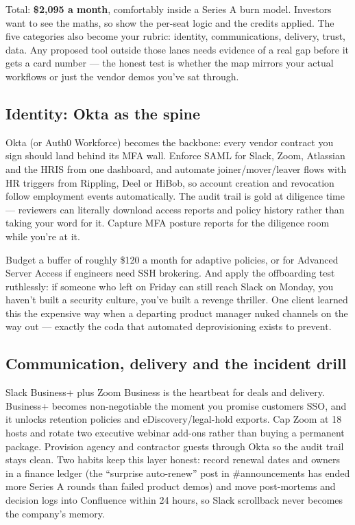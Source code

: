 Total: \textbf{\$2,095 a month}, comfortably inside a Series A burn model. Investors want to see the maths, so show the per-seat logic and the credits applied. The five categories also become your rubric: identity, communications, delivery, trust, data. Any proposed tool outside those lanes needs evidence of a real gap before it gets a card number — the honest test is whether the map mirrors your actual workflows or just the vendor demos you've sat through.



\subsection{Identity: Okta as the spine}


Okta (or Auth0 Workforce) becomes the backbone: every vendor contract you sign should land behind its MFA wall. Enforce SAML for Slack, Zoom, Atlassian and the HRIS from one dashboard, and automate joiner/mover/leaver flows with HR triggers from Rippling, Deel or HiBob, so account creation and revocation follow employment events automatically. The audit trail is gold at diligence time — reviewers can literally download access reports and policy history rather than taking your word for it. Capture MFA posture reports for the diligence room while you're at it.


Budget a buffer of roughly \$120 a month for adaptive policies, or for Advanced Server Access if engineers need SSH brokering. And apply the offboarding test ruthlessly: if someone who left on Friday can still reach Slack on Monday, you haven't built a security culture, you've built a revenge thriller. One client learned this the expensive way when a departing product manager nuked channels on the way out — exactly the coda that automated deprovisioning exists to prevent.



\subsection{Communication, delivery and the incident drill}


Slack Business+ plus Zoom Business is the heartbeat for deals and delivery. Business+ becomes non-negotiable the moment you promise customers SSO, and it unlocks retention policies and eDiscovery/legal-hold exports. Cap Zoom at 18 hosts and rotate two executive webinar add-ons rather than buying a permanent package. Provision agency and contractor guests through Okta so the audit trail stays clean. Two habits keep this layer honest: record renewal dates and owners in a finance ledger (the ``surprise auto-renew'' post in \#announcements has ended more Series A rounds than failed product demos) and move post-mortems and decision logs into Confluence within 24 hours, so Slack scrollback never becomes the company's memory.


